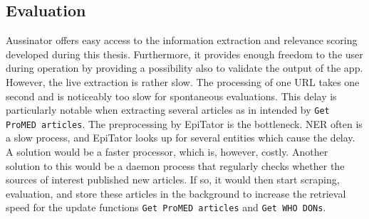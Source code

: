 \subsection{Evaluation}
  Aussinator offers easy access to the information extraction and relevance scoring developed during this thesis. Furthermore, it provides enough freedom to the user during operation by providing a possibility also to validate the output of the app.
  However, the live extraction is rather slow. The processing of one URL takes one second and is noticeably too slow for spontaneous evaluations. This delay is particularly notable when extracting several articles as in intended by \texttt{Get ProMED articles}.
  The preprocessing by EpiTator is the bottleneck.
  NER often is a slow process, and EpiTator looks up for several entities which cause the delay.
  A solution would be a faster processor, which is, however, costly.
  Another solution to this would be a daemon process that regularly checks whether the sources of interest published new articles.
  If so, it would then start scraping, evaluation, and store these articles in the background to increase the retrieval speed for the update functions \texttt{Get ProMED articles} and \texttt{Get WHO DONs}.
